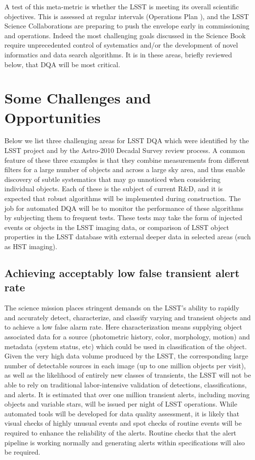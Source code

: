 \documentclass[SE,toc]{lsstdoc}
\begin{document}
A test of this meta-metric is whether the LSST is meeting its overall scientific objectives.  This is assessed at regular intervals (Operations Plan ), and the LSST Science Collaborations are preparing to push the envelope early in commissioning and operations. Indeed the most challenging goals discussed in the Science Book require unprecedented control of systematics and/or the development of novel informatics and data search algorithms. It is in these areas, briefly reviewed below,  that DQA will be most critical.



\section{Some Challenges and Opportunities}

Below we list three challenging areas for LSST DQA which were identified by the LSST project and by the Astro-2010 Decadal Survey review process. A common feature of these three examples is that they combine measurements from different filters for a large number of objects and across a large sky area, and thus enable discovery of subtle systematics that may go unnoticed when considering individual objects. Each of these is the subject of current R\&D, and it is expected that robust algorithms will be implemented during construction.  The job for automated DQA will be to monitor the performance of these algorithms by subjecting them to frequent tests. These tests may take the form of injected events or objects in the LSST imaging data, or comparison of LSST object properties in the LSST database with external deeper data in selected areas (such as HST imaging).

\subsection{Achieving acceptably low false transient alert rate}

The science mission places stringent demands on the LSST's ability to rapidly and accurately detect, characterize, and classify varying and transient objects and to achieve a low false alarm rate.  Here characterization means supplying object associated data for a source (photometric history, color, morphology, motion) and metadata (system status, etc) which could be used in classification of the object.  Given the very high data volume  produced by the LSST, the corresponding large number of detectable sources in each  image (up to one million objects per visit), as well as the  likelihood of entirely new classes of transients, the LSST will not be able  to rely on traditional labor-intensive validation of detections,  classifications, and alerts.  It is estimated that over one million transient alerts, including moving objects and variable stars, will be issued per night of LSST operations. While automated tools will be developed for data quality assessment, it is likely that visual checks of highly unusual events and spot checks of routine events will be required to enhance the reliability of the alerts.  Routine checks that the alert pipeline is working normally and generating alerts within specifications will also be required.
\end{document}
